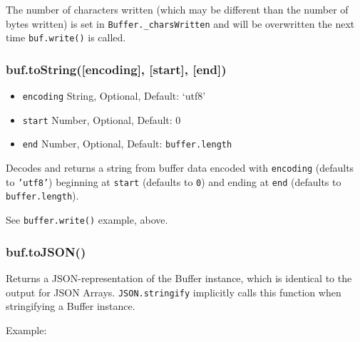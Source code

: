 The number of characters written (which may be different than the number
of bytes written) is set in \texttt{Buffer.\_charsWritten} and will be
overwritten the next time \texttt{buf.write()} is called.

\subsubsection{buf.toString({[}encoding{]}, {[}start{]}, {[}end{]})}

\begin{itemize}
\item
  \texttt{encoding} String, Optional, Default: `utf8'
\item
  \texttt{start} Number, Optional, Default: 0
\item
  \texttt{end} Number, Optional, Default: \texttt{buffer.length}
\end{itemize}

Decodes and returns a string from buffer data encoded with
\texttt{encoding} (defaults to \texttt{'utf8'}) beginning at
\texttt{start} (defaults to \texttt{0}) and ending at \texttt{end}
(defaults to \texttt{buffer.length}).

See \texttt{buffer.write()} example, above.

\subsubsection{buf.toJSON()}

Returns a JSON-representation of the Buffer instance, which is identical
to the output for JSON Arrays. \texttt{JSON.stringify} implicitly calls
this function when stringifying a Buffer instance.

Example:

\begin{Shaded}
\begin{Highlighting}[]
  \NormalTok{);}
 


  

\end{Highlighting}
\end{Shaded}

